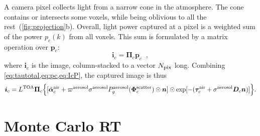 \documentclass[10pt,letterpaper]{article}
\newcommand{\vect}[1]{\bm{#1}}
\newcommand{\yoavcomment}[1]{}
\renewcommand{\yoavcomment}[1]{#1} %
\begin{document}
A camera pixel collects light from a narrow cone in the
atmosphere. The cone contains or intersects some voxels, while being oblivious to all the rest~(\cref{fig:projection}b).
Overall, light power captured at a pixel is a weighted sum of the power
$p_c(k)$ from all voxels.  This sum is formulated by a matrix
operation over ${\bm p}_c$:
\begin{equation}
  {\bm i}_c= {\vect{\Pi}}_c{\bm p}_c
  \;\;,
  \label{eq:IcP}
\end{equation}
where ${\bm i}_c$ is the image, column-stacked to a
vector $N_{\rm pix}$ long.
Combining \cref{eq:tautotal,eq:pc,eq:IcP}, the captured image is thus
\begin{align}
  {\bm i}_c= L^{\rm TOA} {\vect{\Pi}}_c \Big\{
  [\tilde{\vect{\alpha}}^{\rm air}_c + \varpi^{\rm
    aerosol}\sigma^{\rm aerosol} P^{\rm aerosol}_g(\vect{\Phi}^{\rm
    scatter}_c) \odot{\bm n} ]
  \odot
  \exp[-(\vect{\tau}_c^{\rm air} + {\sigma}^{\rm aerosol} {\bm D}_c{\bm n})]
    \Big\} .
  \label{eq:bigIA}
\end{align}


\section{Monte Carlo RT}
\label{sec:monte-carlo-simul}
\end{document}
